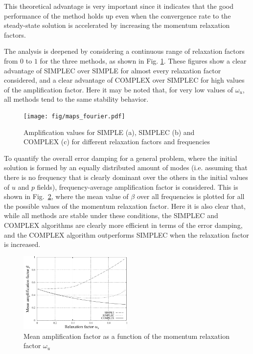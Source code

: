 \documentclass[final,3p,times,11pt,onecolumn]{myElsarticle}
\numberwithin{equation}{section}
\begin{document}
This theoretical advantage is very important since it indicates that the good performance of the method holds up even when the convergence rate to the steady-state solution is accelerated by increasing the momentum relaxation factors. 

The analysis is deepened by considering a continuous range of relaxation factors from $0$ to $1$ for the three methods, as shown in Fig. \ref{fig:1c}. These figures show a clear advantage of SIMPLEC over SIMPLE for almost every relaxation factor considered, and a clear advantage of COMPLEX over SIMPLEC for high values of the amplification factor. Here it may be noted that, for very low values of $\omega_u$, all methods tend to the same stability behavior.
\begin{figure}[b!]
    \centering
    \texttt{[image: fig/maps\_fourier.pdf]}
    \caption{Amplification values for SIMPLE (a), SIMPLEC (b) and COMPLEX (c) for different relaxation factors and frequencies}
    \label{fig:1c}
\end{figure}    
    
To quantify the overall error damping for a general problem, where the initial solution is formed by an equally distributed amount of modes (i.e. assuming that there is no frequency that is clearly dominant over the others in the initial values of $u$ and $p$ fields), frequency-average amplification factor is considered. This is shown in Fig.~\ref{fig:1d}, where the mean value of $\beta$ over all frequencies is plotted for all the possible values of the momentum relaxation factor. Here it is also clear that, while all methods are stable under these conditions, the SIMPLEC and COMPLEX algorithms are clearly more efficient in terms of the error damping, and the COMPLEX algorithm outperforms SIMPLEC when the relaxation factor is increased. 

\begin{figure}[t!]
    \centering
    \includegraphics[width=0.5\textwidth]{fig/meanAmp.pdf}
    \caption{Mean amplification factor as a function of the momentum relaxation factor $\omega_u$}
    \label{fig:1d}
\end{figure}  
\end{document}
